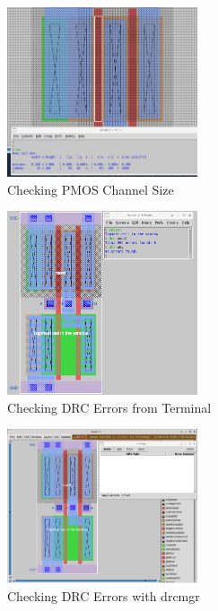 \documentclass{article}
\begin{document}
	\begin{figure}[H]
		\centerline{\includegraphics[width=0.5\textwidth]{nand_pmos_channel_sizing.png}}
		\caption{Checking PMOS Channel Size}
		\label{fig::nand_pmos_channel_sizing}
	\end{figure}
	
	\begin{figure}[H]
		\centerline{\includegraphics[width=0.5\textwidth]{nand_drc_errors_terminal.png}}
		\caption{Checking DRC Errors from Terminal}
		\label{fig::nand_drc_errors_terminal}
	\end{figure}
	
	\begin{figure}[H]
		\centerline{\includegraphics[width=0.5\textwidth]{nand_drc_errors_drcmgr.png}}
		\caption{Checking DRC Errors with drcmgr}
		\label{fig::nand_drc_errors_drcmgr}
	\end{figure}
	
\end{document}
